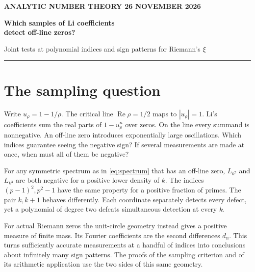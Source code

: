 \documentclass[11pt,letterpaper]{article}
\newcommand{\Rea}{\operatorname{Re}}
\begin{document}
\thispagestyle{plain}
{\small\sffamily\bfseries\color{accent} ANALYTIC NUMBER THEORY \hfill 26 NOVEMBER 2026}
\par\vspace{1.15em}
{\huge\bfseries\color{ink} Which samples of Li coefficients\\[2pt] detect off-line zeros?\par}
\vspace{.65em}
{\large Joint tests at polynomial indices and sign patterns for Riemann's \(\xi\)\par}
\vspace{.85em}\noindent\rule{\textwidth}{.7pt}
\begin{abstract}\noindent
We characterize the schedules on which every symmetric strip spectrum with an off-line zero has simultaneously negative Li coefficients. The exact condition is recurrence to the identity in every finite torus. A missed neighborhood yields a real polynomial whose zeros lie in the strip and whose Li coefficients defeat the proposed test. For polynomial schedules the criterion is a common root modulo every integer. When the parameter is prime, the root must be a unit. For the Riemann zeta function itself, let \(d_n\) be the centered second difference of its Li coefficients. Each of the four sign pairs of \((d_k,d_{k^2})\) occurs on a set of positive lower Banach density with both magnitudes greater than \(0.011\). The first negative second difference is \(d_{118}\). The initial signs imply maximal runs of exactly 235 positive second differences recurring simultaneously around \(k^2\) and \(k^3\), with a negative value immediately before and after each run. The sign thresholds follow from rigorous interval estimates and the recurrence theorem.
\end{abstract}
\section{The sampling question}
Write \(u_\rho=1-1/\rho\). The critical line \(\Rea\rho=1/2\) maps to \(|u_\rho|=1\).
Li's coefficients sum the real parts of \(1-u_\rho^n\) over zeros. On the line every summand is nonnegative. An off-line zero introduces exponentially large oscillations. Which indices guarantee seeing the negative sign? If several measurements are made at once, when must all of them be negative?
\par\smallskip
For any symmetric spectrum as in \eqref{eq:spectrum} that has an off-line zero, \(L_{k^2}\) and \(L_{k^3}\) are both negative for a positive lower density of \(k\). The indices \((p-1)^2,p^2-1\) have the same property for a positive fraction of primes. The pair \(k,k+1\) behaves differently. Each coordinate separately detects every defect, yet a polynomial of degree two defeats simultaneous detection at every \(k\).
\par\smallskip
For actual Riemann zeros the unit-circle geometry instead gives a positive measure of finite mass. Its Fourier coefficients are the second differences \(d_n\). This turns sufficiently accurate measurements at a handful of indices into conclusions about infinitely many sign patterns. The proofs of the sampling criterion and of its arithmetic application use the two sides of this same geometry.
\end{document}
